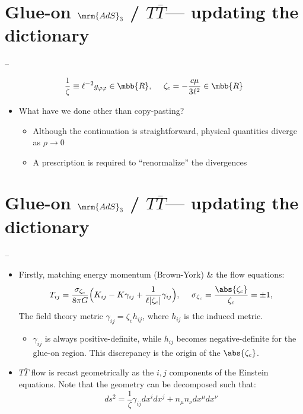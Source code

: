 \documentclass[11pt]{article}
\renewenvironment{frame}[1]%
	{\section*{#1}}%
	{}
\newcommand{\TTbar}{\texorpdfstring{\ensuremath{T\bar{T}}}{TTbar}\xspace}
\begin{document}
\begin{multicols}{3}
\begin{frame}{Glue-on $\mrm{AdS}_3$ / \TTbar --- updating the dictionary}{%
	\textcite{Apolo:2023vnm} -- 
}
\figGlueon

\begin{equation}
	\frac{1}{\zeta} \equiv \ell^{-2} g_{\varphi\varphi} \in \mbb{R},
\ \quad
	\zeta_c = - \frac{c \mu}{3\ell^2} \in \mbb{R}
\end{equation}
\begin{itemize}
\item What have we done other than copy-pasting?
	\begin{itemize}
	\item Although the continuation is straightforward, physical quantities diverge as $\rho \to 0$
	
	\item A prescription is required to ``renormalize'' the divergences
	\end{itemize}
	
\end{itemize}


\end{frame}

\begin{frame}{Glue-on $\mrm{AdS}_3$ / \TTbar --- updating the dictionary}{%
	\textcite{Kraus:2018xrn} -- 
}
\begin{itemize}
\item Firstly, matching energy momentum (Brown-York) \& the flow equations:
	\begin{equation}
		T_{ij}= \frac{\sigma_{\zeta_c}}{8\pi G} \Big( K_{ij} -  K \gamma_{ij} + \frac{1}{\ell |\zeta_c|}\gamma_{ij}\Big), \ \quad \sigma_{\zeta_c} = \frac{\abs{\zeta_c}}{\zeta_c} = \pm 1,
		\label{BYtensor}
	\end{equation}
	The field theory metric $\gamma_{ij} = \zeta_c h_{ij}$, where $h_{ij}$ is the induced metric.
	
	\begin{itemize}
	\item $\gamma_{ij}$ is always positive-definite, while $h_{ij}$ becomes negative-definite for the glue-on region.
	This discrepancy is the origin of the $\abs{\zeta_c}$.
	\end{itemize}
	
	
	
\item \TTbar flow is recast geometrically as the $i,j$ components of the Einstein equations. 
Note that the geometry can be decomposed such that:
	\begin{equation}
		ds^2 = \frac{1}{\zeta} \gamma_{ij}dx^i dx^j+n_\mu n_\nu dx^\mu dx^\nu
	\end{equation}
\end{itemize}
\end{frame}



\end{multicols}
\end{document}
